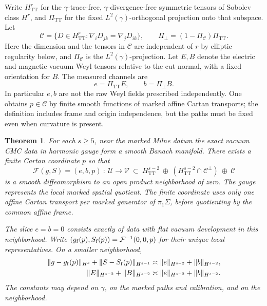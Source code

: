 \documentclass[11pt]{article}
\newtheorem{theorem}{Theorem}
\theoremstyle{remark}
\newcommand{\TT}{\mathrm{TT}}
\newcommand{\C}{\mathcal C}
\newcommand{\F}{\mathcal F}
\begin{document}
Write \(H^r_{\TT}\) for the \(\gamma\)-trace-free, \(\gamma\)-divergence-free symmetric tensors of Sobolev class \(H^r\), and \(\Pi_{\TT}\) for the fixed \(L^2(\gamma)\)-orthogonal projection onto that subspace. Let
\[
 \C=\{D\in H^r_{\TT}: \nabla_iD_{jk}=\nabla_jD_{ik}\},
 \qquad
 \Pi_{\perp}=(1-\Pi_{\C})\Pi_{\TT}.
\]
Here the dimension and the tensors in \(\C\) are independent of \(r\) by elliptic regularity below, and \(\Pi_\C\) is the \(L^2(\gamma)\)-projection. Let \(E,B\) denote the electric and magnetic vacuum Weyl tensors relative to the cut normal, with a fixed orientation for \(B\). The measured channels are
\[
  e=\Pi_{\TT}E,\qquad b=\Pi_{\perp}B .
\]
In particular \(e,b\) are not the raw Weyl fields prescribed independently. One obtains \(p\in\C\) by finite smooth functions of marked affine Cartan transports; the definition includes frame and origin independence, but the paths must be fixed even when curvature is present.

\begin{theorem}\label{thm:main}
For each \(s\geq5\), near the marked Milne datum the exact vacuum CMC data in harmonic gauge form a smooth Banach manifold. There exists a finite Cartan coordinate \(p\) so that
\begin{equation}
 \F(g,S)=(e,b,p)\ :\ 
 \mathcal U\longrightarrow
 \mathcal V\ \subset\
 H^{s-2}_{\TT}\ \oplus\
 (H^{s-2}_{\TT}\cap\C^\perp)\ \oplus\ \C
 \label{eq:chart}
\end{equation}
is a smooth diffeomorphism to an open product neighborhood of zero. The gauge represents the local marked spatial quotient. The finite coordinate uses only one affine Cartan transport per marked generator of \(\pi_1\Sigma\), before quotienting by the common affine frame.

The slice \(e=b=0\) consists exactly of data with flat vacuum development in this neighborhood. Write \((g_{\rm f}(p),S_{\rm f}(p))=\F^{-1}(0,0,p)\) for their unique local representatives. On a smaller neighborhood,
\begin{align}
 \|g-g_{\rm f}(p)\|_{H^s}+\|S-S_{\rm f}(p)\|_{H^{s-1}}
     &\asymp \|e\|_{H^{s-2}}+\|b\|_{H^{s-2}},\label{eq:metric-est}\\
 \|E\|_{H^{s-2}}+\|B\|_{H^{s-2}}
     &\asymp \|e\|_{H^{s-2}}+\|b\|_{H^{s-2}} .\label{eq:weyl-est}
\end{align}
The constants may depend on \(\gamma\), on the marked paths and calibration, and on the neighborhood.
\end{theorem}
\end{document}
